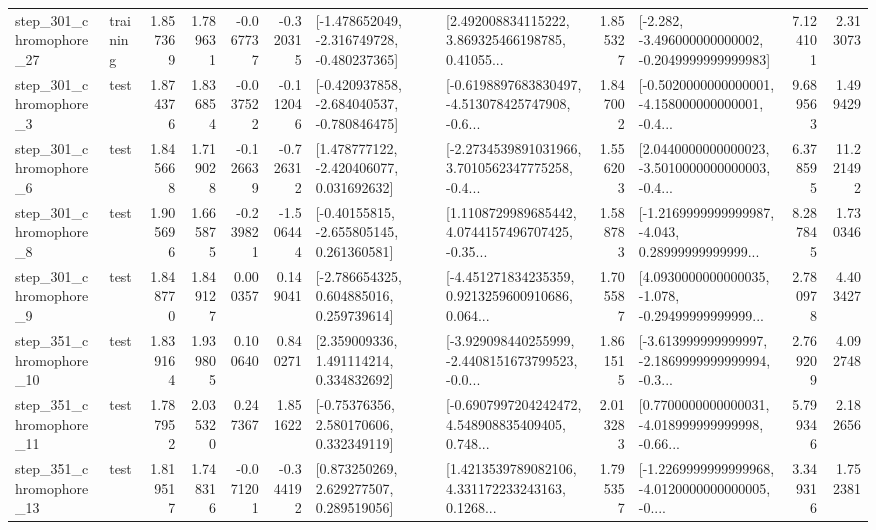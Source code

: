 \begin{tabular}{llrrrrllrlrr}
  step\_301\_chromophore\_27 &  training &      1.857369 &    1.789631 &     -0.067737 & -0.320315 &  [-1.478652049, -2.316749728, -0.480237365] &  [2.492008834115222, 3.869325466198785, 0.41055... &       1.855327 &  [-2.282, -3.496000000000002, -0.2049999999999983] &            7.124101 &          2.313073 \\
   step\_301\_chromophore\_3 &      test &      1.874376 &    1.836854 &     -0.037522 & -0.112046 &  [-0.420937858, -2.684040537, -0.780846475] &  [-0.6198897683830497, -4.513078425747908, -0.6... &       1.847002 &  [-0.5020000000000001, -4.158000000000001, -0.4... &            9.689563 &          1.499429 \\
   step\_301\_chromophore\_6 &      test &      1.845668 &    1.719028 &     -0.126639 & -0.726312 &    [1.478777122, -2.420406077, 0.031692632] &  [-2.2734539891031966, 3.7010562347775258, -0.4... &       1.556203 &  [2.0440000000000023, -3.5010000000000003, -0.4... &            6.378595 &         11.221492 \\
   step\_301\_chromophore\_8 &      test &      1.905696 &    1.665875 &     -0.239821 & -1.506444 &    [-0.40155815, -2.655805145, 0.261360581] &  [1.1108729989685442, 4.0744157496707425, -0.35... &       1.588783 &  [-1.2169999999999987, -4.043, 0.28999999999999... &            8.287845 &          1.730346 \\
   step\_301\_chromophore\_9 &      test &      1.848770 &    1.849127 &      0.000357 &  0.149041 &    [-2.786654325, 0.604885016, 0.259739614] &  [-4.451271834235359, 0.9213259600910686, 0.064... &       1.705587 &  [4.0930000000000035, -1.078, -0.29499999999999... &            2.780978 &          4.403427 \\
  step\_351\_chromophore\_10 &      test &      1.839164 &    1.939805 &      0.100640 &  0.840271 &     [2.359009336, 1.491114214, 0.334832692] &  [-3.929098440255999, -2.4408151673799523, -0.0... &       1.861515 &  [-3.613999999999997, -2.1869999999999994, -0.3... &            2.769209 &          4.092748 \\
  step\_351\_chromophore\_11 &      test &      1.787952 &    2.035320 &      0.247367 &  1.851622 &     [-0.75376356, 2.580170606, 0.332349119] &  [-0.6907997204242472, 4.548908835409405, 0.748... &       2.013283 &  [0.7700000000000031, -4.018999999999998, -0.66... &            5.799346 &          2.182656 \\
  step\_351\_chromophore\_13 &      test &      1.819517 &    1.748316 &     -0.071201 & -0.344192 &     [0.873250269, 2.629277507, 0.289519056] &  [1.4213539789082106, 4.331172233243163, 0.1268... &       1.795357 &  [-1.2269999999999968, -4.0120000000000005, -0.... &            3.349316 &          1.752381 \\

\end{tabular}
